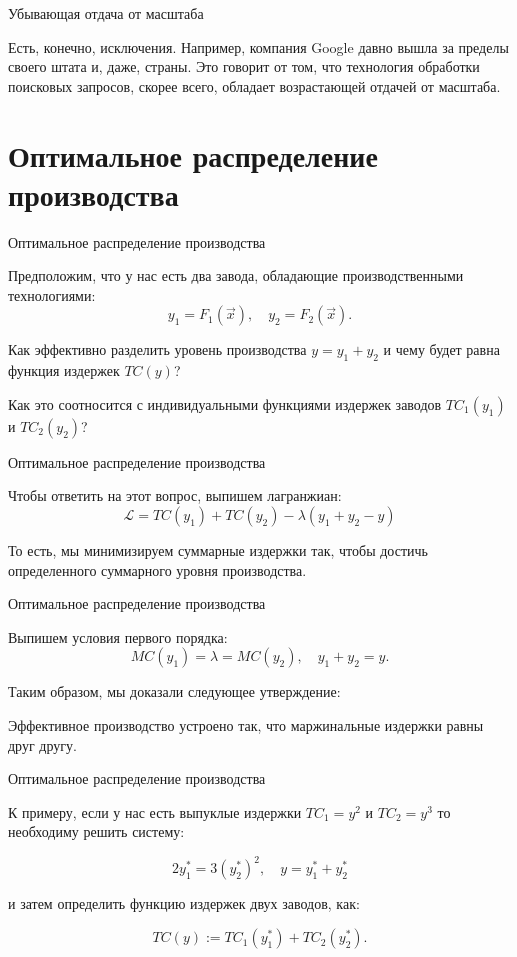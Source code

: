 \documentclass{beamer}
\begin{document}
\begin{frame}{Убывающая отдача от масштаба}

Есть, конечно, исключения. Например, компания Google давно вышла за пределы своего штата и, даже, страны. Это говорит от том, что технология обработки поисковых запросов, скорее всего, обладает возрастающей отдачей от масштаба.

\end{frame}

\section{Оптимальное распределение производства}

\begin{frame}{Оптимальное распределение производства}

Предположим, что у нас есть два завода, обладающие производственными технологиями:
$$ y_1 = F_1(\vec x), \quad y_2 = F_2(\vec x).$$

Как эффективно разделить уровень производства $y = y_1 + y_2$ и чему будет равна функция издержек $TC(y)$? 

Как это соотносится с индивидуальными функциями издержек заводов $TC_1(y_1)$ и $TC_2(y_2)$?

\end{frame}

\begin{frame}{Оптимальное распределение производства}

Чтобы ответить на этот вопрос, выпишем лагранжиан:
$$ \mathcal{L} = TC(y_1) + TC(y_2) - \lambda (y_1 + y_2 - y)$$

То есть, мы минимизируем суммарные издержки так, чтобы достичь определенного суммарного уровня производства.

\end{frame}

\begin{frame}{Оптимальное распределение производства}

Выпишем условия первого порядка:
$$ MC(y_1) = \lambda = MC(y_2), \quad y_1 + y_2 = y.$$

Таким образом, мы доказали следующее утверждение:
\begin{lemma}
Эффективное производство устроено так, что маржинальные издержки равны друг другу.
\end{lemma}

\end{frame}

\begin{frame}{Оптимальное распределение производства}

К примеру, если у нас есть выпуклые издержки $TC_1 = y^2$ и $TC_2 = y^3$ то необходиму решить систему:

$$ 2y_1^{\ast} = 3(y_2^{\ast})^2, \quad y = y_1^{\ast} + y_2^{\ast}$$

и затем определить функцию издержек двух заводов, как:

$$ TC(y) := TC_1(y_1^{\ast}) + TC_2(y_2^{\ast}).$$

\end{frame}
\end{document}
